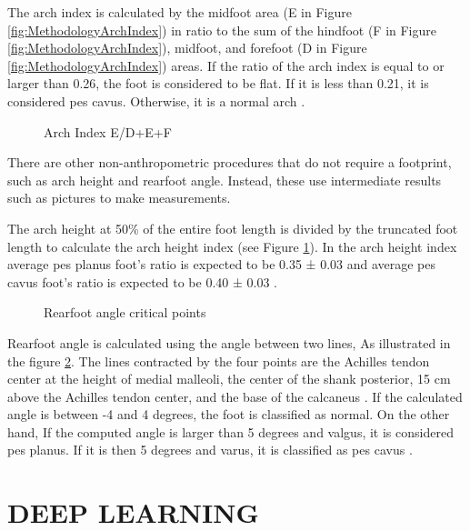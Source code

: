 The arch index is calculated by the midfoot area (E in Figure \ref{fig:MethodologyArchIndex}) in ratio to the sum of the hindfoot (F in Figure \ref{fig:MethodologyArchIndex}), midfoot, and forefoot (D in Figure \ref{fig:MethodologyArchIndex}) areas. If the ratio of the arch index is equal to or larger than 0.26, the foot is considered to be flat. If it is less than 0.21, it is considered pes cavus. Otherwise, it is a normal arch \cite{igbigbi2005arch}. 

\begin{figure}[htbp]
\centering
{}
\caption{Arch Index E/D+E+F \cite{miller2014effect}}
\label{fig:MethodologyArchHeightIndex}
\end{figure}

There are other non-anthropometric procedures that do not require a footprint, such as arch height and rearfoot angle. Instead, these use intermediate results such as pictures to make measurements.

The arch height at 50\% of the entire foot length is divided by the truncated foot length to calculate the arch height index (see Figure \ref{fig:MethodologyArchHeightIndex}). In the arch height index average pes planus foot’s ratio is expected to be 0.35 ± 0.03 and average pes cavus foot’s ratio is expected to be 0.40 ± 0.03 \cite{hillstrom2013foot}.

\begin{figure}[htbp]
\centering
{}
\caption{Rearfoot angle critical points \cite{langley2016clinical}}
\label{fig:MethodologyRearfootAngle}
\end{figure}

Rearfoot angle is calculated using the angle between two lines, As illustrated in the figure \ref{fig:MethodologyRearfootAngle}. The lines contracted by the four points are the Achilles tendon center at the height of medial malleoli, the center of the shank posterior, 15 cm above the Achilles tendon center, and the base of the calcaneus \cite{huerta2008relationship}. If the calculated angle is between -4 and 4 degrees, the foot is classified as normal. On the other hand, If the computed angle is larger than 5 degrees and valgus, it is considered pes planus. If it is then 5 degrees and varus, it is classified as pes cavus \cite{jonson1997intraexaminer}.

\section{DEEP LEARNING}

